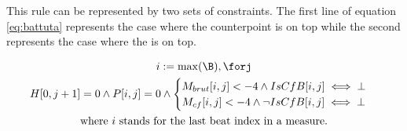 This rule can be represented by two sets of constraints. The first line of equation \ref{eq:battuta} represents the case where the counterpoint is on top while the second represents the case where the \cf is on top.

\begin{equation}
    \begin{gathered}
        i := \max (\B), \forj\\
        H[0, j+1] = 0 \land P[i, j] = 0 \land \begin{cases}
            M_{brut}[i, j] < -4 \land IsCfB[i, j] \iff \bot\\
            M_{cf}[i, j] < -4 \land \lnot IsCfB[i, j] \iff \bot
        \end{cases}\\
        \text{where } i \text{ stands for the last beat index in a measure.}
    \end{gathered}
    \label{eq:battuta}
\end{equation}